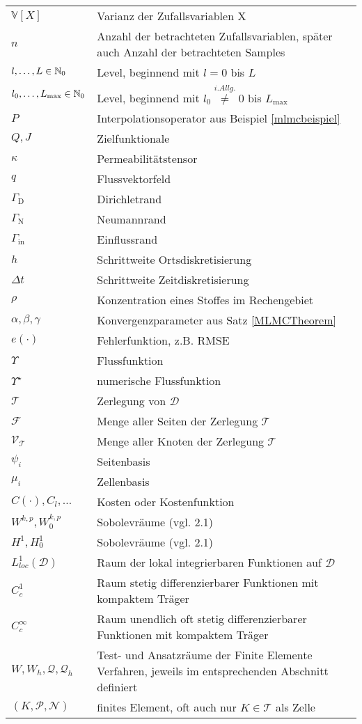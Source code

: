 \begin{longtable}[c]{ p{} p{}}
	$ \mathbb{V}[X] $ & Varianz der Zufallsvariablen X \\
	$ n $ & Anzahl der betrachteten Zufallsvariablen, später auch Anzahl der betrachteten Samples \\
	$ l,\dots,L \in \mathbb{N}_0$ & Level, beginnend mit $ l=0 $ bis $ L $ \\
	$ l_0, \dots , L_{\text{max}} \in \mathbb{N}_0 $ & Level, beginnend mit $ l_0 \stackrel{i.Allg.}{\not =} 0 $ bis $ L_{\text{max}} $  \\
	$ P $ & Interpolationsoperator aus Beispiel \ref{mlmcbeispiel} \\
	$ Q,J $ & Zielfunktionale \\
	$ \kappa $ & Permeabilitätstensor \\
	$ q $ & Flussvektorfeld \\
	$ \Gamma_{\text{D}} $ & Dirichletrand \\
	$ \Gamma_{\text{N}} $ & Neumannrand \\
	$ \Gamma_{\text{in}} $ & Einflussrand \\
	$ h $ & Schrittweite Ortsdiskretisierung \\
	$ \Delta t $ & Schrittweite Zeitdiskretisierung \\
	$ \rho $ & Konzentration eines Stoffes im Rechengebiet \\
	$ \alpha,\beta,\gamma $ & Konvergenzparameter aus Satz \ref{MLMCTheorem} \\
	$ e(\cdot) $ & Fehlerfunktion, z.B. RMSE \\
	$ \Upsilon $ & Flussfunktion \\
	$ \Upsilon^{\star} $ & numerische Flussfunktion \\
	$ \mathcal{T} $ & Zerlegung von $ \mathcal{D} $ \\
	$ \mathcal{F} $ & Menge aller Seiten der Zerlegung $ \mathcal{T} $ \\
	$ \mathcal{V}_{\mathcal{T}} $ & Menge aller Knoten der Zerlegung $ \mathcal{T} $\\
	$ {\psi_i} $ & Seitenbasis \\
	$ {\mu_i} $ & Zellenbasis \\
	$ C(\cdot) , C_l , \dots $ & Kosten oder Kostenfunktion \\
	$ W^{k,p},W_0^{k,p} $ & Sobolevräume (vgl. 2.1) \\
	$ H^1,H_0^1$ & Sobolevräume (vgl. 2.1) \\
	$ L^1_{loc}(\mathcal{ D}) $ & Raum der lokal integrierbaren Funktionen auf $ \mathcal{ D} $ \\
	$ C_c^{1} $ & Raum stetig differenzierbarer Funktionen mit kompaktem  Träger \\
	$ C_c^{\infty} $ & Raum unendlich oft stetig differenzierbarer Funktionen mit kompaktem  Träger \\
	$ W,W_h,\mathcal{Q},\mathcal{Q}_h $ & Test- und Ansatzräume der Finite Elemente Verfahren, jeweils im entsprechenden Abschnitt definiert\\
	$ (K,\mathcal{P},\mathcal{N}) $ & finites Element, oft auch nur $ K \in \mathcal{T}$ als Zelle \\
	\hline
\end{longtable}

